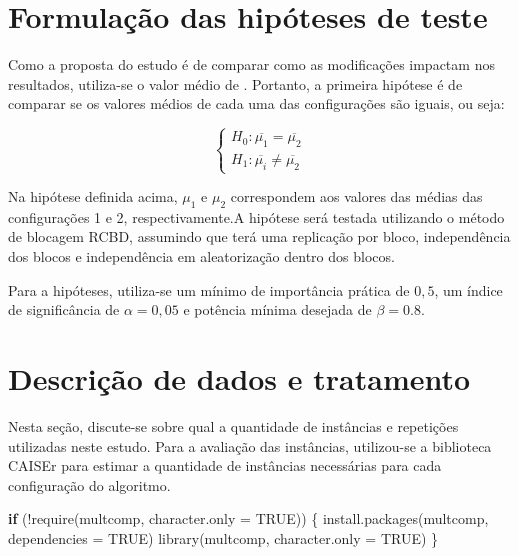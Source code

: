 \documentclass[
]{article}
\newenvironment{Shaded}{\begin{snugshade}}{\end{snugshade}}
\newcommand{\AttributeTok}[1]{\textcolor[rgb]{0.77,0.63,0.00}{#1}}
\newcommand{\ConstantTok}[1]{\textcolor[rgb]{0.00,0.00,0.00}{#1}}
\newcommand{\ControlFlowTok}[1]{\textcolor[rgb]{0.13,0.29,0.53}{\textbf{#1}}}
\newcommand{\FunctionTok}[1]{\textcolor[rgb]{0.00,0.00,0.00}{#1}}
\newcommand{\NormalTok}[1]{#1}
\newcommand{\SpecialCharTok}[1]{\textcolor[rgb]{0.00,0.00,0.00}{#1}}
\newcommand{\StringTok}[1]{\textcolor[rgb]{0.31,0.60,0.02}{#1}}
\begin{document}
\hypertarget{formulauxe7uxe3o-das-hipuxf3teses-de-teste}{%
\section{Formulação das hipóteses de
teste}\label{formulauxe7uxe3o-das-hipuxf3teses-de-teste}}

Como a proposta do estudo é de comparar como as modificações impactam
nos resultados, utiliza-se o valor médio de . Portanto, a primeira
hipótese é de comparar se os valores médios de cada uma das
configurações são iguais, ou seja:

\[
\begin{cases} H_0: \overline{\mu_1} = \overline{\mu_2}\\H_1: \overline{\mu_i} \neq \overline{\mu_2}\end{cases}
\]

Na hipótese definida acima, \(\mu_1\) e \(\mu_2\) correspondem aos
valores das médias das configurações 1 e 2, respectivamente.A hipótese
será testada utilizando o método de blocagem RCBD, assumindo que terá
uma replicação por bloco, independência dos blocos e independência em
aleatorização dentro dos blocos.

Para a hipóteses, utiliza-se um mínimo de importância prática de
\(0,5\), um índice de significância de \(\alpha = 0,05\) e potência
mínima desejada de \(\beta = 0.8\).

\hypertarget{descriuxe7uxe3o-de-dados-e-tratamento}{%
\section{Descrição de dados e
tratamento}\label{descriuxe7uxe3o-de-dados-e-tratamento}}

Nesta seção, discute-se sobre qual a quantidade de instâncias e
repetições utilizadas neste estudo. Para a avaliação das instâncias,
utilizou-se a biblioteca CAISEr para estimar a quantidade de instâncias
necessárias para cada configuração do algoritmo.

\begin{Shaded}
\begin{Highlighting}[]
\ControlFlowTok{if}\NormalTok{ (}\SpecialCharTok{!}\FunctionTok{require}\NormalTok{(}\StringTok{\textquotesingle{}multcomp\textquotesingle{}}\NormalTok{, }\AttributeTok{character.only =} \ConstantTok{TRUE}\NormalTok{)) \{}
      \FunctionTok{install.packages}\NormalTok{(}\StringTok{\textquotesingle{}multcomp\textquotesingle{}}\NormalTok{, }\AttributeTok{dependencies =} \ConstantTok{TRUE}\NormalTok{)}
      \FunctionTok{library}\NormalTok{(}\StringTok{\textquotesingle{}multcomp\textquotesingle{}}\NormalTok{, }\AttributeTok{character.only =} \ConstantTok{TRUE}\NormalTok{)}
\NormalTok{\}}
\end{Highlighting}
\end{Shaded}
\end{document}
